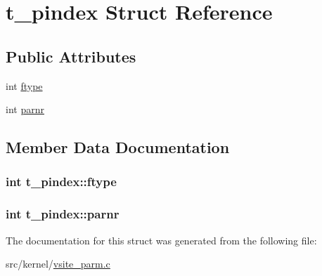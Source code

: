\hypertarget{structt__pindex}{\section{t\-\_\-pindex \-Struct \-Reference}
\label{structt__pindex}
}
\subsection*{\-Public \-Attributes}
\begin{DoxyCompactItemize}
\item 
int \hyperlink{structt__pindex_a3109b99844f117fd1f60916052bfbb1d}{ftype}
\item 
int \hyperlink{structt__pindex_a3f99c772ebf100f6daf8576952258059}{parnr}
\end{DoxyCompactItemize}


\subsection{\-Member \-Data \-Documentation}
\hypertarget{structt__pindex_a3109b99844f117fd1f60916052bfbb1d}{
\subsubsection[{ftype}]{\setlength{\rightskip}{0pt plus 5cm}int {\bf t\-\_\-pindex\-::ftype}}}\label{structt__pindex_a3109b99844f117fd1f60916052bfbb1d}
\hypertarget{structt__pindex_a3f99c772ebf100f6daf8576952258059}{
\subsubsection[{parnr}]{\setlength{\rightskip}{0pt plus 5cm}int {\bf t\-\_\-pindex\-::parnr}}}\label{structt__pindex_a3f99c772ebf100f6daf8576952258059}


\-The documentation for this struct was generated from the following file\-:\begin{DoxyCompactItemize}
\item 
src/kernel/\hyperlink{vsite__parm_8c}{vsite\-\_\-parm.\-c}\end{DoxyCompactItemize}
